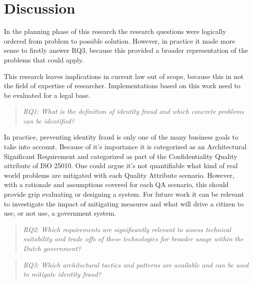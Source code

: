\chapter{Discussion}\label{s:discussion}
In the planning phase of this research the research questions were logically ordered from problem to possible solution. However, in practice it made more sense to firstly answer RQ3, because this provided a broader representation of the problems that could apply. 

This research leaves implications in current law out of scope, because this in not the field of expertise of researcher. Implementations based on this work need to be evaluated for a legal base.

\begin{quote}\emph{RQ1: What is the definition of identity fraud and which concrete problems can be identified?}\end{quote}
In practice, preventing identity fraud is only one of the many business goals to take into account. Because of it's importance it is categorized as an Architectural Significant Requirement and categorized as part of the Confidentiality Quality attribute of ISO 25010. One could argue it's not quantifiable what kind of real world problems are mitigated with each Quality Attribute scenario. However, with a rationale and assumptions covered for each QA scenario, this should provide grip evaluating or designing a system. For future work it can be relevant to investigate the impact of mitigating measures and what will drive a citizen to use, or not use, a government system.
\begin{quote}\emph{RQ2: Which requirements are significantly relevant to assess technical suitability and trade offs of these technologies for broader usage within the Dutch government?}\end{quote}

\lipsum[1-1]

\begin{quote}\emph{RQ3: Which architectural tactics and patterns are available and can be used to mitigate identity fraud?}\end{quote}
\lipsum[1-1]

